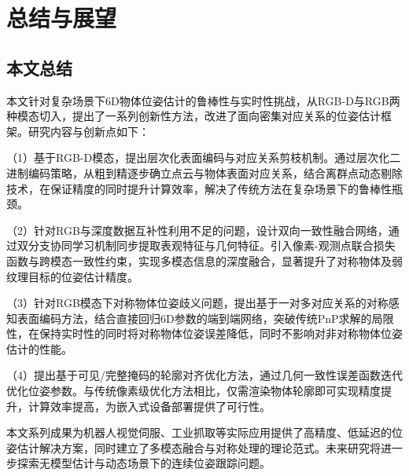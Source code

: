 \chapter{总结与展望}

\section{本文总结}

\par 本文针对复杂场景下6D物体位姿估计的鲁棒性与实时性挑战，从RGB-D与RGB两种模态切入，提出了一系列创新性方法，改进了面向密集对应关系的位姿估计框架。研究内容与创新点如下：
\par （1）基于RGB-D模态，提出层次化表面编码与对应关系剪枝机制。通过层次化二进制编码策略，从粗到精逐步确立点云与物体表面对应关系，结合离群点动态剔除技术，在保证精度的同时提升计算效率，解决了传统方法在复杂场景下的鲁棒性瓶颈。
\par （2）针对RGB与深度数据互补性利用不足的问题，设计双向一致性融合网络，通过双分支协同学习机制同步提取表观特征与几何特征。引入像素-观测点联合损失函数与跨模态一致性约束，实现多模态信息的深度融合，显著提升了对称物体及弱纹理目标的位姿估计精度。
\par （3）针对RGB模态下对称物体位姿歧义问题，提出基于一对多对应关系的对称感知表面编码方法，结合直接回归6D参数的端到端网络，突破传统PnP求解的局限性，在保持实时性的同时将对称物体位姿误差降低，同时不影响对非对称物体位姿估计的性能。
\par （4）提出基于可见/完整掩码的轮廓对齐优化方法，通过几何一致性误差函数迭代优化位姿参数。与传统像素级优化方法相比，仅需渲染物体轮廓即可实现精度提升，计算效率提高，为嵌入式设备部署提供了可行性。
\par 本文系列成果为机器人视觉伺服、工业抓取等实际应用提供了高精度、低延迟的位姿估计解决方案，同时建立了多模态融合与对称处理的理论范式。未来研究将进一步探索无模型估计与动态场景下的连续位姿跟踪问题。

